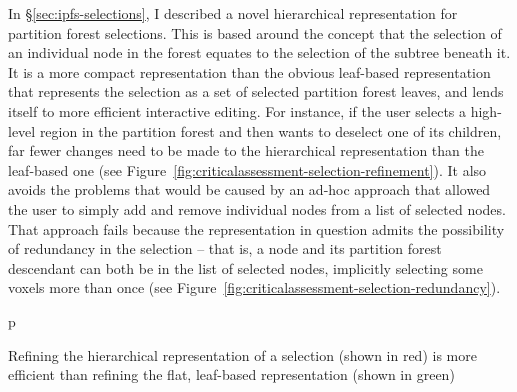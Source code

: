 In \S\ref{sec:ipfs-selections}, I described a novel hierarchical representation for partition forest selections. This is based around the concept that the selection of an individual node in the forest equates to the selection of the subtree beneath it. It is a more compact representation than the obvious leaf-based representation that represents the selection as a set of selected partition forest leaves, and lends itself to more efficient interactive editing. For instance, if the user selects a high-level region in the partition forest and then wants to deselect one of its children, far fewer changes need to be made to the hierarchical representation than the leaf-based one (see Figure~\ref{fig:criticalassessment-selection-refinement}). It also avoids the problems that would be caused by an ad-hoc approach that allowed the user to simply add and remove individual nodes from a list of selected nodes. That approach fails because the representation in question admits the possibility of redundancy in the selection -- that is, a node and its partition forest descendant can both be in the list of selected nodes, implicitly selecting some voxels more than once (see Figure~\ref{fig:criticalassessment-selection-redundancy}).

\begin{stusubfig}{p}
	\\
\caption{Refining the hierarchical representation of a selection (shown in red) is more efficient than refining the flat, leaf-based representation (shown in green)}
\label{fig:criticalassessment-selection-refinement}
\end{stusubfig}

